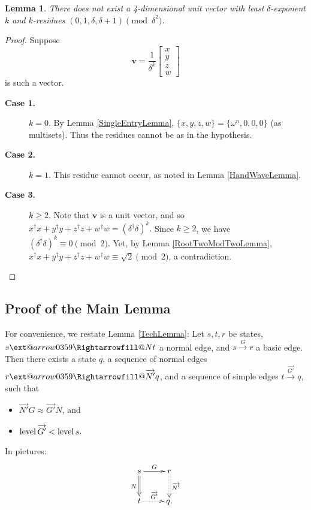 \documentclass{dalthesis}
\makeatletter
\theoremstyle{theorem}
\newtheorem{lemma}[theorem]{Lemma}
\theoremstyle{definition}
\theoremstyle{definition}  %
\theoremstyle{definition}
\renewcommand{\:}{\mathbin{:}}
\newcommand{\xRightarrow}[2][]{\ext@arrow
  0359\Rightarrowfill@{#1}{#2}}
\newcommand{\level}{\mathop{\rm level}\nolimits}
\newcommand{\edge}{\xrightarrow}
\newcommand{\nedge}{\xRightarrow}
\renewcommand{\vec}{\overrightarrow}
\makeatother
\begin{document}
\begin{lemma}
\label{NotExist4DimLemma}
There does not exist a 4-dimensional unit vector with least
$\delta$-exponent $k$ and $k$-residues $(0, 1, \delta, \delta+1)\pmod{\delta^2}$.
\end{lemma}

\begin{proof}
Suppose \[\boldsymbol{v} = \frac{1}{\delta^k}\begin{bmatrix}
x\\
y\\
z\\
w
\end{bmatrix}\]
 is such a vector.
 \begin{description}
 \item[{\bf Case 1.}]
  $k = 0.$ By Lemma \ref{SingleEntryLemma}, $\{x,y,z,w\} = \{\omega^n,0,0,0\}$ (as multisets). Thus the residues cannot be as in the hypothesis.
  
  \item[{\bf Case 2.}] $k = 1.$ This residue cannot occur, as noted in Lemma \ref{HandWaveLemma}.

\item[{\bf Case 3.}] $k\geq 2.$ Note that $\boldsymbol{v}$ is a unit vector, and so $x^\dag x + y^\dag y + z^\dag z + w^\dag w = (\delta^\dag\delta)^k.$ Since $k\geq 2$, we have $(\delta^\dag\delta)^k\equiv 0\pmod{2}$. Yet, by Lemma \ref{RootTwoModTwoLemma}, $x^\dag x + y^\dag y + z^\dag z + w^\dag w \equiv \sqrt{2}\pmod{2}$,
a contradiction.
  
\end{description}

\end{proof}

\subsection{Proof of the Main Lemma}
For convenience, we restate Lemma \ref{TechLemma}: Let $s,t,r$ be states, $s\nedge{N} t$ a normal edge, and $s\edge{G} r$ a basic edge. Then there exists a state $q$, a sequence of normal edges $r\nedge{\vec{N'}}q$, and a sequence of simple edges $t\edge{\vec{G'}}q$, such that 
  \begin{itemize}
  \item $\vec{N'}G\approx\vec{G'}N$, and 
  \item $\level{\vec{G'}} < \level{s}$.
  \end{itemize}
  In pictures:
    \[ \xymatrix{
    s \ar@{=>}[d]_{N} \ar[r]^{G} &
    r \ar@{:>}[d]^{\vec{N'}} \\
    t \ar@{.>}[r]^{\vec{G'}} &
    q.
  }
  \]
\end{document}
